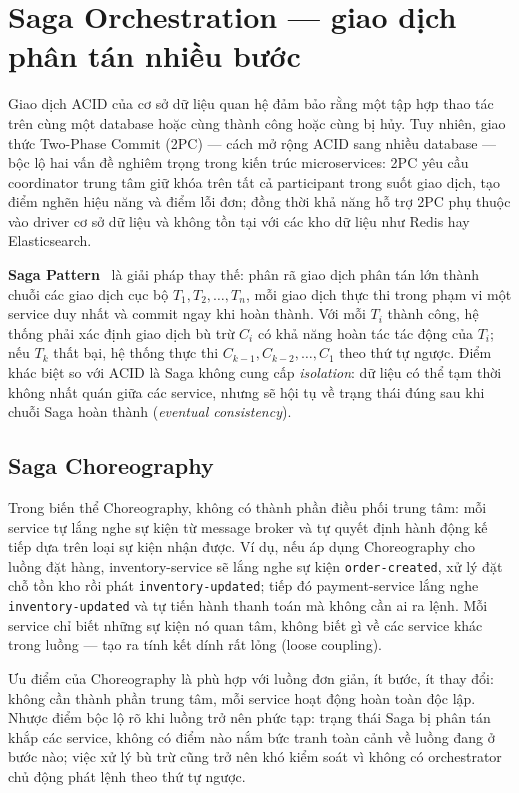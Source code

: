 \documentclass[../DoAn.tex]{subfiles}
\begin{document}
\section{Saga Orchestration --- giao dịch phân tán nhiều bước}
\label{section:2.3}

Giao dịch ACID của cơ sở dữ liệu quan hệ đảm bảo rằng một tập hợp thao tác trên cùng một
database hoặc cùng thành công hoặc cùng bị hủy. Tuy nhiên, giao thức Two-Phase Commit (2PC)
--- cách mở rộng ACID sang nhiều database --- bộc lộ hai vấn đề nghiêm trọng trong kiến trúc
microservices: 2PC yêu cầu coordinator trung tâm giữ khóa trên tất cả participant trong suốt
giao dịch, tạo điểm nghẽn hiệu năng và điểm lỗi đơn; đồng thời khả năng hỗ trợ 2PC phụ thuộc
vào driver cơ sở dữ liệu và không tồn tại với các kho dữ liệu như Redis hay Elasticsearch.

\textbf{Saga Pattern}~\cite{garcia1987, richardson2018} là giải pháp thay thế: phân rã giao
dịch phân tán lớn thành chuỗi các giao dịch cục bộ $T_1, T_2, \ldots, T_n$, mỗi giao dịch
thực thi trong phạm vi một service duy nhất và commit ngay khi hoàn thành. Với mỗi $T_i$
thành công, hệ thống phải xác định giao dịch bù trừ $C_i$ có khả năng hoàn tác tác động của
$T_i$; nếu $T_k$ thất bại, hệ thống thực thi $C_{k-1}, C_{k-2}, \ldots, C_1$ theo thứ tự
ngược. Điểm khác biệt so với ACID là Saga không cung cấp \textit{isolation}: dữ liệu có thể
tạm thời không nhất quán giữa các service, nhưng sẽ hội tụ về trạng thái đúng sau khi chuỗi
Saga hoàn thành (\textit{eventual consistency}).

\subsection{Saga Choreography}

Trong biến thể Choreography, không có thành phần điều phối trung tâm: mỗi service tự lắng
nghe sự kiện từ message broker và tự quyết định hành động kế tiếp dựa trên loại sự kiện nhận
được. Ví dụ, nếu áp dụng Choreography cho luồng đặt hàng, inventory-service sẽ lắng nghe
sự kiện \texttt{order-created}, xử lý đặt chỗ tồn kho rồi phát \texttt{inventory-updated};
tiếp đó payment-service lắng nghe \texttt{inventory-updated} và tự tiến hành thanh toán mà
không cần ai ra lệnh. Mỗi service chỉ biết những sự kiện nó quan tâm, không biết gì về các
service khác trong luồng --- tạo ra tính kết dính rất lỏng (loose coupling).

Ưu điểm của Choreography là phù hợp với luồng đơn giản, ít bước, ít thay đổi: không cần
thành phần trung tâm, mỗi service hoạt động hoàn toàn độc lập. Nhược điểm bộc lộ rõ khi
luồng trở nên phức tạp: trạng thái Saga bị phân tán khắp các service, không có điểm nào nắm
bức tranh toàn cảnh về luồng đang ở bước nào; việc xử lý bù trừ cũng trở nên khó kiểm soát
vì không có orchestrator chủ động phát lệnh theo thứ tự ngược.
\end{document}

